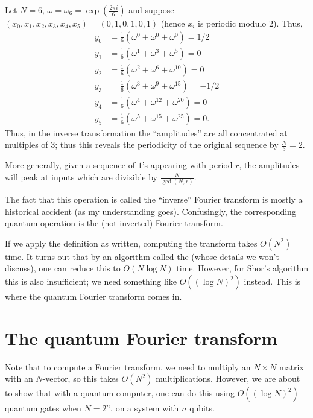 \begin{example}
	Let $N = 6$, $\omega = \omega_6 = \exp(\frac{2\pi i}{6})$
	and suppose $(x_0,x_1,x_2,x_3,x_4,x_5)=(0,1,0,1,0,1)$
	(hence $x_i$ is periodic modulo $2$).
	Thus,
	\begin{align*}
		y_0 &= \tfrac16\left(\omega^0 + \omega^0+ \omega^0\right) = 1/2 \\
		y_1 &= \tfrac16\left(\omega^1 + \omega^3 + \omega^5\right) = 0 \\
		y_2 &= \tfrac16\left( \omega^2 + \omega^{6} + \omega^{10} \right) = 0 \\
		y_3 &= \tfrac16\left( \omega^3 + \omega^9 + \omega^{15} \right) = -1/2 \\
		y_4 &= \tfrac16\left( \omega^4 + \omega^{12} + \omega^{20} \right) = 0 \\
		y_5 &= \tfrac16\left( \omega^5 + \omega^{15} + \omega^{25} \right) = 0.
	\end{align*}
	Thus, in the inverse transformation the ``amplitudes''
	are all concentrated at multiples of $3$;
	thus this reveals the periodicity of the original
	sequence by $\frac N3 = 2$.
\end{example}
More generally, given a sequence of $1$'s appearing with period $r$,
the amplitudes will peak at inputs which are divisible by $\frac{N}{\gcd(N,r)}$.
\begin{remark}
	The fact that this operation is called the ``inverse''
	Fourier transform is mostly a historical accident
	(as my understanding goes).
	Confusingly, the corresponding quantum operation is the
	(not-inverted) Fourier transform.
\end{remark}
If we apply the definition as written, computing the transform takes $O(N^2)$ time.
It turns out that by an algorithm called the 
(whose details we won't discuss), one can reduce this to $O(N \log N)$ time.
However, for Shor's algorithm this is also insufficient;
we need something like $O\left( (\log N)^2 \right)$ instead.
This is where the quantum Fourier transform comes in.

\section{The quantum Fourier transform}
Note that to compute a Fourier transform, we need to multiply an $N \times N$ matrix
with an $N$-vector, so this takes $O(N^2)$ multiplications.
However, we are about to show that with a quantum computer,
one can do this using $O( (\log N)^2 )$ quantum gates when $N = 2^n$,
on a system with $n$ qubits.

